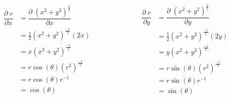 \documentclass[12pt, fleqn]{report}                             %
\DeclareMathOperator \Space {\quad}                             %
\newcommand{\Wrap}[1]{\left( #1 \right)}                        %
\newcommand{\Cos}[1]{\cos\Wrap{#1}}                             %
\newcommand{\Sin}[1]{\sin\Wrap{#1}}                             %
\newcommand \Partial[2]                                        %
        {\dfrac{\partial \; #1}{\partial #2}}                      %
\begin{document}
                    \begin{equation*}
                        \begin{split}
                            \Partial{r}{x}
                                &= \Partial{\Wrap{x^2 + y^2}^{\frac{1}{2}}}{x}      \\
                                &= \frac{1}{2}\Wrap{x^2 + y^2}^{\frac{-1}{2}}(2x)   \\ 
                                &= x \Wrap{x^2 + y^2}^{\frac{-1}{2}}                \\
                                &= r\Cos{\theta} \Wrap{r^2}^{\frac{-1}{2}}          \\
                                &= r\Cos{\theta} r^{-1}                             \\
                                &= \Cos{\theta}     
                        \end{split}
                        \Space\Space
                        \Space\Space
                        \begin{split}
                            \Partial{r}{y}
                                &= \Partial{\Wrap{x^2 + y^2}^{\frac{1}{2}}}{y}      \\
                                &= \frac{1}{2}\Wrap{x^2 + y^2}^{\frac{-1}{2}}(2y)   \\
                                &= y \Wrap{x^2 + y^2}^{\frac{-1}{2}}                \\
                                &= r\Sin{\theta} \Wrap{r^2}^{\frac{-1}{2}}          \\
                                &= r\Sin{\theta} r^{-1}                             \\
                                &= \Sin{\theta}                                     
                        \end{split}
                    \end{equation*}
\end{document}

